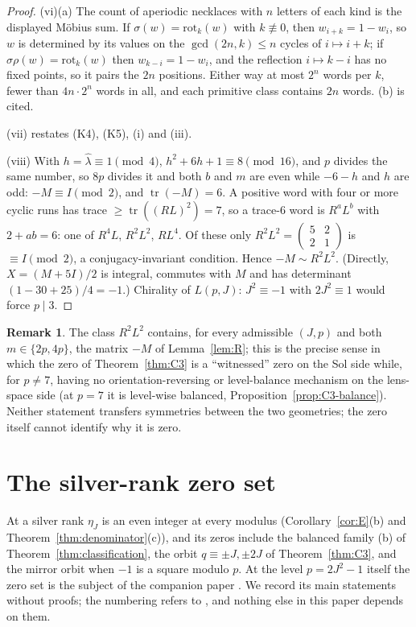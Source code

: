 \documentclass[11pt]{article}
\theoremstyle{definition}
\newtheorem{remark}[theorem]{Remark}
\begin{document}
\begin{proof}
(vi)(a) The count of aperiodic necklaces with $n$ letters of each kind
is the displayed M\"obius sum.  If $\sigma(w)=\mathrm{rot}_k(w)$ with
$k\not\equiv0$, then $w_{i+k}=1-w_i$, so $w$ is determined by its values
on the $\gcd(2n,k)\leq n$ cycles of $i\mapsto i+k$; if
$\sigma\rho(w)=\mathrm{rot}_k(w)$ then $w_{k-i}=1-w_i$, and the reflection
$i\mapsto k-i$ has no fixed points, so it pairs the $2n$ positions.
Either way at most $2^n$ words per $k$, fewer than $4n\cdot2^n$ words in
all, and each primitive class contains $2n$ words.  (b) is cited.

(vii) restates (K4), (K5), (i) and (iii).

(viii) With $h=\hat\lambda\equiv1\pmod4$, $h^2+6h+1\equiv8\pmod{16}$, and
$p$ divides the same number, so $8p$ divides it and both $b$ and $m$ are
even while $-6-h$ and $h$ are odd: $-M\equiv I\pmod2$, and
$\operatorname{tr}(-M)=6$.  A positive word with four or more cyclic
runs has trace $\geq\operatorname{tr}((RL)^2)=7$, so a trace-$6$ word is
$R^aL^b$ with $2+ab=6$: one of $R^4L$, $R^2L^2$, $RL^4$.  Of these only
$R^2L^2=\begin{pmatrix}5&2\\2&1\end{pmatrix}$ is $\equiv I\pmod2$, a
conjugacy-invariant condition.  Hence $-M\sim R^2L^2$.  (Directly,
$X=(M+5I)/2$ is integral, commutes with $M$ and has determinant
$(1-30+25)/4=-1$.)  Chirality of $L(p,J)$: $J^2\equiv-1$ with
$2J^2\equiv1$ would force $p\mid3$.
\end{proof}

\begin{remark}
The class $R^2L^2$ contains, for every admissible $(J,p)$ and both
$m\in\{2p,4p\}$, the matrix $-M$ of Lemma~\ref{lem:R}; this is the
precise sense in which the zero of Theorem~\ref{thm:C3} is a
``witnessed'' zero on the Sol side while, for $p\neq7$, having no
orientation-reversing or level-balance mechanism on the lens-space side
(at $p=7$ it is level-wise balanced, Proposition~\ref{prop:C3-balance}).
Neither statement
transfers symmetries between the two geometries; the zero itself
cannot identify why it is zero.
\end{remark}

\section{The silver-rank zero set}
\label{sec:silver-zero-set}

At a silver rank $\eta_J$ is an even integer at every modulus
(Corollary~\ref{cor:E}(b) and Theorem~\ref{thm:denominator}(c)), and its
zeros include the balanced family (b) of
Theorem~\ref{thm:classification}, the orbit $q\equiv\pm J,\pm2J$ of
Theorem~\ref{thm:C3}, and the mirror orbit when $-1$ is a square modulo
$p$.  At the level $p=2J^2-1$ itself the zero set is the subject of the
companion paper \cite{SilverRankZeros2026}.  We record its main statements without
proofs; the numbering refers to \cite{SilverRankZeros2026}, and nothing
else in this paper depends on them.
\end{document}
